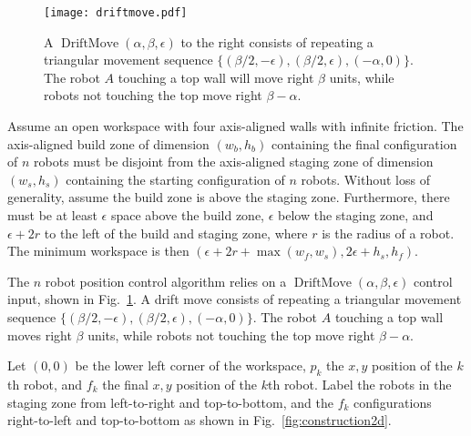 \begin{figure}
\begin{center}
	\texttt{[image: driftmove.pdf]}
\end{center}
\caption{\label{fig:driftmove}
A  $\operatorname{DriftMove}(\alpha, \beta, \epsilon)$ to the right consists of repeating a triangular movement sequence $\{ (\beta/2,-\epsilon),(\beta/2,\epsilon),(-\alpha,0)\}$. The robot $A$ touching a top wall will move right $\beta$ units, while robots not touching the top move right $\beta-\alpha$.
}
\end{figure}


Assume an open workspace with four axis-aligned walls with infinite friction.
The axis-aligned build zone of dimension $(w_b, h_b)$ containing the final configuration of $n$ robots must be disjoint from the axis-aligned staging zone of dimension $(w_s, h_s)$  containing the starting configuration of $n$ robots. Without loss of generality, assume the build zone  is above the staging zone. 
Furthermore, there must be at least $\epsilon$ space above the build zone, $\epsilon$ below the staging zone, and $\epsilon + 2r$ to the left of the build and staging zone, where $r$ is the radius of a robot.  The minimum workspace is then $(\epsilon + 2r + \max(w_f,w_s), 2\epsilon + h_s,h_f)$.

The $n$ robot position control algorithm relies on a $\operatorname{DriftMove}(\alpha, \beta, \epsilon)$ control input, shown in Fig.\  \ref{fig:driftmove}.
A drift move consists of repeating a triangular movement sequence $\{ (\beta/2,-\epsilon),(\beta/2,\epsilon),(-\alpha,0)\}$. The robot $A$ touching a top wall moves right $\beta$ units, while robots not touching the top move right $\beta-\alpha$.

Let $(0,0)$ be the lower left corner of the workspace, $p_k$ the $x,y$ position of the $k$th robot, and $f_k$ the final $x,y$ position of the $k$th robot. Label the robots in the staging zone from left-to-right and top-to-bottom, and the $f_k$ configurations right-to-left and top-to-bottom as shown in Fig.~\ref{fig:construction2d}.

